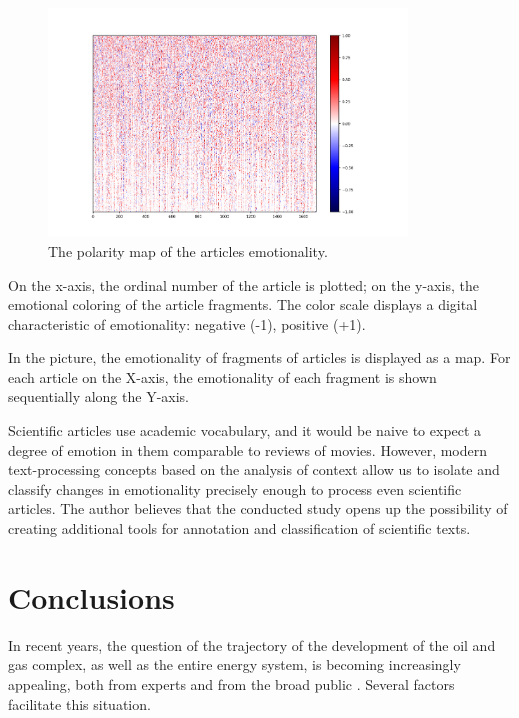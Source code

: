 \documentclass[12pt]{report}
\theoremstyle{definition}
\begin{document}
\begin{figure}[ht]
	\centering
	\includegraphics[width=0.85\textwidth]{op4_6}
	\caption{The polarity map of the articles emotionality.}
	\label{fig:op4_6}
\end{figure}

On the x-axis, the ordinal number of the article is plotted; on the y-axis, the emotional coloring of the article fragments. 
The color scale displays a digital characteristic of emotionality: negative (-1), positive (+1).

In the picture, the emotionality of fragments of articles is displayed as a map. 
For each article on the X-axis, the emotionality of each fragment is shown sequentially along the Y-axis.

Scientific articles use academic vocabulary, and it would be naive to expect a degree of emotion in them comparable to reviews of movies. 
However, modern text-processing concepts based on the analysis of context allow us to isolate and classify changes in emotionality precisely enough to process even scientific articles. 
The author believes that the conducted study opens up the possibility of creating additional tools for annotation and classification of scientific texts.

\part{Conclusions}

In recent years, the question of the trajectory of the development of the oil and gas complex, as well as the entire energy system, is becoming increasingly appealing, both from experts and from the broad public \cite{bakhtin2017trend, kuzminov2017global}. 
Several factors facilitate this situation.
\end{document}
